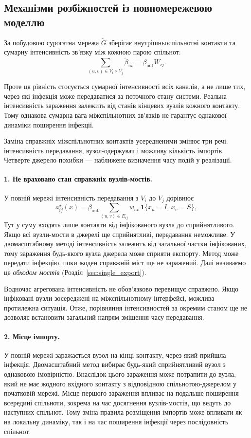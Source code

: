 \documentclass[a4paper,fleqn]{cas-sc}
\newcommand{\ind}{\mathbf{1}}
\begin{document}
\subsection{Механізми розбіжностей із повномережевою моделлю }
\label{sec:sources}

За побудовою сурогатна мережа $\tilde G$ зберігає внутрішньоспільнотні контакти та сумарну інтенсивність зв'язку між кожною парою спільнот:
\[
\sum_{(u,v)\in V_i\times V_j}\tilde\beta_{uv}
=
\beta_{\mathrm{out}}W_{ij}.
\]

Проте ця рівність стосується сумарної інтенсивності всіх каналів, а не лише тих, через які інфекція може передаватися за поточного стану системи. Реальна інтенсивність зараження залежить від станів кінцевих вузлів кожного контакту. Тому однакова сумарна вага міжспільнотних зв'язків не гарантує однакової динаміки поширення інфекції.

Заміна справжніх міжспільнотних контактів усередненими змінює три речі: інтенсивність передавання, вузол-одержувач і можливу кількість імпортів. Четверте джерело похибки --- наближене визначення часу подій у реалізації.


\paragraph{1. Не враховано стан справжніх вузлів-мостів.}
У повній мережі інтенсивність передавання з $V_i$ до $V_j$ дорівнює
\begin{equation}
\label{eq:exact_rate}
a^\star_{ij}(x)=\beta_{\mathrm{out}}\sum_{(u,v)\in E_{ij}}w_{uv}\,\ind\{x_u=I,\,x_v=S\},
\end{equation}
Тут у суму входять лише контакти від інфікованого вузла до сприйнятливого. Якщо всі вузли-мости в джерелі ще сприйнятливі, передавання неможливе. У двомасштабному методі інтенсивність залежить від загальної частки інфікованих, тому зараження будь-якого вузла джерела може сприяти експорту. Метод може передати інфекцію, поки жоден справжній міст ще не заражений. Далі називаємо це \emph{обходом мостів} (Розділ~\ref{sec:single_export}).

Водночас агрегована інтенсивність не обов'язково перевищує справжню. Якщо інфіковані вузли зосереджені на міжспільнотному інтерфейсі, можлива протилежна ситуація. Отже, порівняння інтенсивностей за окремим станом ще не дозволяє встановити загальний напрям зміщення часу передавання.

\paragraph{2. Місце імпорту.}
У повній мережі заражається вузол на кінці контакту, через який прийшла інфекція. Двомасштабний метод вибирає будь-який сприйнятливий вузол з однаковою імовірністю. 
Внаслідок цього зараження може потрапити до вузла, який не має жодного вхідного контакту з відповідною спільнотою-джерелом у початковій мережі. Місце першого зараження впливає на подальше поширення всередині спільноти, зокрема на час досягнення вузлів-мостів, що ведуть до наступних спільнот. Тому зміна правила розміщення імпортів може впливати як на локальну динаміку, так і на час поширення інфекції через послідовність спільнот.
\end{document}
